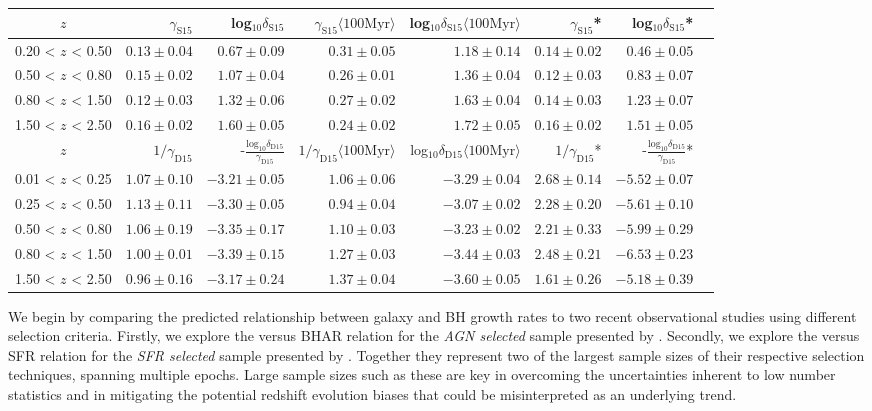 \begin{table*}
\begin{tabular}{crrrrrrr} \hline
$z$ &
$\gamma_{\mathrm{S15}}$  &
log$_{10} \delta_{\mathrm{S15}}$  &
$\gamma_{\mathrm{S15}} \langle \mathrm{100 Myr} \rangle$ &
log$_{10} \delta_{\mathrm{S15}} \langle \mathrm{100 Myr} \rangle$ &
$\gamma_{\mathrm{S15}}$*  &
log$_{10} \delta_{\mathrm{S15}}$* \\
\hline\hline
0.20 < $z$ < 0.50 & $0.13 \pm 0.04$ & $0.67 \pm 0.09$ & $0.31 \pm 0.05$ & $1.18 \pm 0.14$ & $0.14 \pm 0.02$ & $0.46 \pm 0.05$ \\
0.50 < $z$ < 0.80 & $0.15 \pm 0.02$ & $1.07 \pm 0.04$ & $0.26 \pm 0.01$ & $1.36 \pm 0.04$ & $0.12 \pm 0.03$ & $0.83 \pm 0.07$ \\
0.80 < $z$ < 1.50 & $0.12 \pm 0.03$ & $1.32 \pm 0.06$ & $0.27 \pm 0.02$ & $1.63 \pm 0.04$ & $0.14 \pm 0.03$ & $1.23 \pm 0.07$ \\
1.50 < $z$ < 2.50 & $0.16 \pm 0.02$ & $1.60 \pm 0.05$ & $0.24 \pm 0.02$ & $1.72 \pm 0.05$ & $0.16 \pm 0.02$ & $1.51 \pm 0.05$ \\
\hline
$z$ & $1 / \gamma_{\mathrm{D15}}$  &
-$\frac{\mathrm{log}_{10} \delta_{\mathrm{D15}}}{\gamma_{\mathrm{D15}}}$ &
$1 / \gamma_{\mathrm{D15}} \langle \mathrm{100 Myr} \rangle$ &
log$_{10} \delta_{\mathrm{D15}} \langle \mathrm{100 Myr} \rangle$ &
$1 / \gamma_{\mathrm{D15}}$*  &
-$\frac{\mathrm{log}_{10} \delta_{\mathrm{D15}}}{\gamma_{\mathrm{D15}}}$* \\
\hline\hline
0.01 < $z$ < 0.25 & $1.07 \pm 0.10$  & $-3.21 \pm 0.05$ & $1.06 \pm 0.06$ & $-3.29 \pm 0.04$ & $2.68 \pm 0.14$ & $-5.52 \pm 0.07$ \\
0.25 < $z$ < 0.50 & $1.13 \pm 0.11$  & $-3.30 \pm 0.05$ & $0.94 \pm 0.04$ & $-3.07 \pm 0.02$ & $2.28 \pm 0.20$ & $-5.61 \pm 0.10$ \\
0.50 < $z$ < 0.80 & $1.06 \pm 0.19$  & $-3.35 \pm 0.17$ & $1.10 \pm 0.03$ & $-3.23 \pm 0.02$ & $2.21 \pm 0.33$ & $-5.99 \pm 0.29$ \\
0.80 < $z$ < 1.50 & $1.00 \pm 0.01$  & $-3.39 \pm 0.15$ & $1.27 \pm 0.03$ & $-3.44 \pm 0.03$ & $2.48 \pm 0.21$ & $-6.53 \pm 0.23$ \\
1.50 < $z$ < 2.50 & $0.96 \pm 0.16$  & $-3.17 \pm 0.24$ & $1.37 \pm 0.04$ & $-3.60 \pm 0.05$ & $1.61 \pm 0.26$ & $-5.18 \pm 0.39$ \\
\hline
\end{tabular}
\label{table:slopes}
\end{table*}

We begin by comparing the predicted relationship between galaxy and BH growth
rates to two recent observational studies using different selection criteria.
Firstly, we explore the  versus BHAR relation for the \textit{AGN
selected} sample presented by \citet{Stanley2015}.  Secondly, we explore the
 versus SFR relation for the \textit{SFR selected} sample presented by
\citet{Delvecchio2015}. Together they represent two of the largest sample sizes
of their respective selection techniques, spanning multiple epochs. Large
sample sizes such as these are key in overcoming the uncertainties inherent to
low number statistics and in mitigating the potential redshift evolution biases
that could be misinterpreted as an underlying trend.

